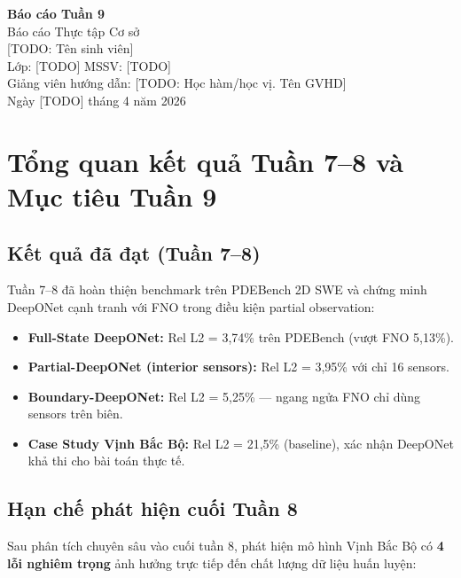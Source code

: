 \documentclass[12pt,a4paper]{article}
\begin{document}
\begin{center}
  {\LARGE\bfseries Báo cáo Tuần 9}\\[4pt]
  {\large Báo cáo Thực tập Cơ sở}\\[12pt]
  [TODO: Tên sinh viên]\\
  Lớp: [TODO] \quad MSSV: [TODO]\\
  Giảng viên hướng dẫn: [TODO: Học hàm/học vị. Tên GVHD]\\[4pt]
  Ngày [TODO] tháng 4 năm 2026
\end{center}

\vspace{1em}

\section{Tổng quan kết quả Tuần 7--8 và Mục tiêu Tuần 9}

\subsection{Kết quả đã đạt (Tuần 7--8)}

Tuần 7--8 đã hoàn thiện benchmark trên PDEBench 2D SWE và chứng minh DeepONet cạnh tranh với FNO trong điều kiện partial observation:
\begin{itemize}[nosep]
  \item \textbf{Full-State DeepONet:} Rel L2 = 3,74\% trên PDEBench (vượt FNO 5,13\%).
  \item \textbf{Partial-DeepONet (interior sensors):} Rel L2 = 3,95\% với chỉ 16 sensors.
  \item \textbf{Boundary-DeepONet:} Rel L2 = 5,25\% --- ngang ngửa FNO chỉ dùng sensors trên biên.
  \item \textbf{Case Study Vịnh Bắc Bộ:} Rel L2 = 21,5\% (baseline), xác nhận DeepONet khả thi cho bài toán thực tế.
\end{itemize}

\subsection{Hạn chế phát hiện cuối Tuần 8}

Sau phân tích chuyên sâu vào cuối tuần 8, phát hiện mô hình Vịnh Bắc Bộ có \textbf{4 lỗi nghiêm trọng} ảnh hưởng trực tiếp đến chất lượng dữ liệu huấn luyện:
\end{document}
